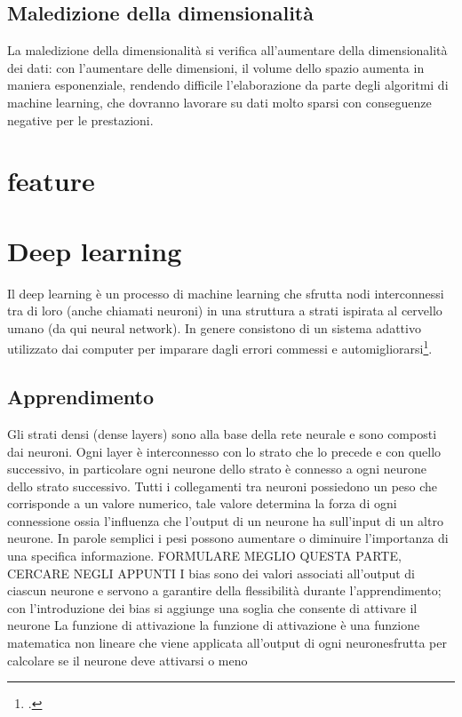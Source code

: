 \subsection{Maledizione della dimensionalità}
La maledizione della dimensionalità si verifica all'aumentare della dimensionalità dei dati: con l'aumentare delle dimensioni, il volume dello spazio aumenta in maniera esponenziale, rendendo difficile l'elaborazione da parte degli algoritmi di machine learning, che dovranno lavorare su dati molto sparsi con conseguenze negative per le prestazioni.

\section{feature}

\section{Deep learning}
Il deep learning è un processo di machine learning che sfrutta nodi interconnessi tra di loro (anche chiamati neuroni) in una struttura a strati ispirata al cervello umano (da qui neural network).
In genere consistono di un sistema adattivo utilizzato dai computer per imparare dagli errori commessi e automigliorarsi\footcite{site:rete-neurale}.

\subsection{Apprendimento}
Gli strati densi (dense layers) sono alla base della rete neurale e sono composti dai neuroni.
Ogni layer è interconnesso con lo strato che lo precede e con quello successivo, in particolare ogni neurone dello strato è connesso a ogni neurone dello strato successivo.
Tutti i collegamenti tra neuroni possiedono un peso che corrisponde a un valore numerico, tale valore determina la forza di ogni connessione ossia l'influenza che l'output di un neurone ha sull'input di un altro neurone. In parole semplici i pesi possono aumentare o diminuire l'importanza di una specifica informazione.
{FORMULARE MEGLIO QUESTA PARTE, CERCARE NEGLI APPUNTI
I bias sono dei valori associati all'output di ciascun neurone e servono a garantire della flessibilità durante l'apprendimento; con l'introduzione dei bias si aggiunge una soglia che consente di attivare il neurone 
La funzione di attivazione la funzione di attivazione è una funzione matematica non lineare che viene applicata all'output di ogni neuronesfrutta per calcolare se il neurone deve attivarsi o meno 
}

